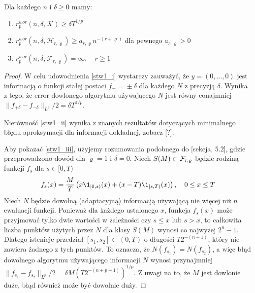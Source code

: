 \documentclass[oik, pdftex, robocza, man]{mgrwms}
\begin{document}
    \begin{stw} \label{stw1}
        Dla każdego $n$ i $\delta \geq 0$ mamy:
        \begin{enumerate}[label=(\roman*)]
            \item \label{stw1_i} $r^{wor}_{p}(n, \delta, \mathcal{K}) \geq \delta T^{1/p}$
            \item \label{stw1_ii} $r^{wor}_{p}(n, \delta, \mathcal{H}_{r,\varrho}) \geq a_{r,\varrho}n^{-(r + \varrho)}$ dla pewnego $a_{r,\varrho} > 0$
            \item \label{stw1_iii} $r^{wor}_{p}(n, \delta, \mathcal{F}_{r,\varrho}) = \infty, \quad r \geq 1$
        \end{enumerate}
    \end{stw}
    \begin{proof}
        W celu udowodnienia \ref{stw1_i} wystarczy zauważyć, że $y = (0, \ldots, 0)$ jest informacją o funkcji stałej postaci $f_{\pm} \!=\! \pm \delta$ dla każdego $N$ z precyzją $\delta$. Wynika z tego, że error dowlonego algorytmu używającego $N$ jest równy conajmniej $\| f_{+\delta} - f_{-\delta} \|_{L^{p}} / 2 = \delta T^{1/p}$.

        Nierówność \ref{stw1_ii} wynika z znanych rezultatów dotyczących minimalnego błędu aproksymacji dla informacji dokładnej, zobacz [?].

        Aby pokazać \ref{stw1_iii}, użyjemy rozumowania podobnego do \cite{PoA} [sekcja, 5.2], gdzie przeprowadzono dowód dla $\varrho = 1$ i $\delta = 0$. Niech $S(M) \subset \mathcal{F}_{r, \varrho}$ będzie rodziną funkcji $f_{s}$ dla $s \in [0, T)$
        \begin{equation*}
            f_{s}(x) = \frac{M}{T}\left( x\1_{[0,s)}(x) + (x-T)\1_{[s,T)}(x) \right), \quad 0 \leq x \leq T
        \end{equation*}
        Niech $N$ będzie dowolną (adaptacyjną) informacją używającą nie więcej niż $n$ ewaluacji funkcji. Ponieważ dla każdego ustalonego $x$, funkcja $f_{s}(x)$ może przyjmować tylko dwie wartości w zależności czy $s \leq x$ lub $s > x$, to całkowita liczba punktów użytych przez $N$ dla klasy $S(M)$ wynosi co najwyżej $2^{n}-1$. Dlatego istenieje przedział $[s_{1}, s_{2}] \subset (0,T)$ o długości $T 2^{-(n-1)}$, który nie zawiera żadnego z tych punktów. To oznacza, że  $N(f_{s_{1}}) = N(f_{s_{2}})$, a więc błąd dowolnego algorytmu używającego informacji $N$ wynosi przynajmniej $\| f_{s_{1}} - f_{s_{2}} \|_{L^{p}} / 2 = \delta M(T 2^{-(n+p+1)})^{1/p}$. Z uwagi na to, że $M$ jest dowlonie duże, błąd również może być dowolnie duży.
    \end{proof}
\end{document}
